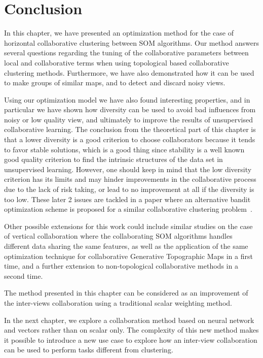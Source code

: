 \section{Conclusion}
\label{sec:cc-conlu}

In this chapter, we have presented an optimization method for the case of horizontal collaborative clustering between SOM algorithms. Our method answers several questions regarding the tuning of the collaborative parameters between local and collaborative terms when using topological based collaborative clustering methods. Furthermore, we have also demonstrated how it can be used to make groups of similar maps, and to detect and discard noisy views.

Using our optimization model we have also found interesting properties, and in particular we have shown how diversity can be used to avoid bad influences from noisy or low quality view, and ultimately to improve the results of unsupervised collaborative learning. The conclusion from the theoretical part of this chapter is that a lower diversity is a good criterion to choose collaborators because it tends to favor stable solutions, which is a good thing since stability is a well known good quality criterion to find the intrinsic structures of the data set in unsupervised learning. However, one should keep in mind that the low diversity criterion has its limits and may hinder improvements in the collaborative process due to the lack of risk taking, or lead to no improvement at all if the diversity is too low. These later 2 issues are tackled in a paper where an alternative bandit optimization scheme is proposed for a similar collaborative clustering problem~\cite{Sublime2018a2}. 

Other possible extensions for this work could include similar studies on the case of vertical collaboration where the collaborating SOM algorithms handles different data sharing the same features, as well as the application of the same optimization technique for collaborative Generative Topographic Maps in a first time, and a further extension to non-topological collaborative methods in a second time.

The method presented in this chapter can be considered as an improvement of the inter-views collaboration using a traditional scalar weighting method. 

In the next chapter, we explore a collaboration method based on neural network and vectors rather than on scalar only. The complexity of this new method makes it possible to introduce a new use case to explore how an inter-view collaboration can be used to perform tasks different from clustering.
